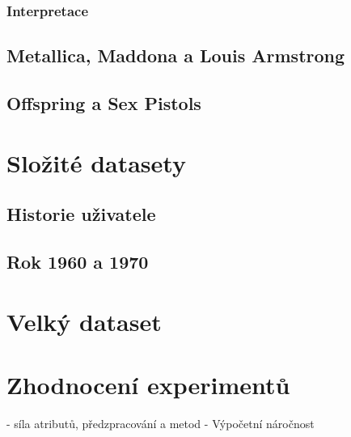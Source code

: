\documentclass[thesis=M,czech]{FITthesis}[2012/06/26]
\begin{document}
\subsubsection*{Interpretace}

\subsection{Metallica, Maddona a Louis Armstrong}


\subsection{Offspring a Sex Pistols}

\section{Složité datasety}

\subsection{Historie uživatele}

\subsection{Rok 1960 a 1970}

\section{Velký dataset}

\section{Zhodnocení experimentů}
- síla atributů, předzpracování a metod
- Výpočetní náročnost
\end{document}
